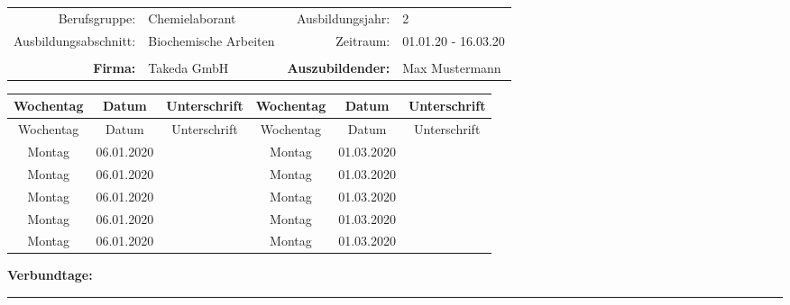 \documentclass[a4paper]{scrartcl}
\begin{document}
\begin{table}
	\centering
	\begin{tabular}{rlrl}
	Berufsgruppe: & Chemielaborant & Ausbildungsjahr: & 2\\
	Ausbildungsabschnitt: & Biochemische Arbeiten & Zeitraum: & 01.01.20 - 16.03.20\\
	& & & \\
	\textbf{Firma:} & Takeda GmbH & \textbf{Auszubildender:} & Max Mustermann\\
	\end{tabular}
\end{table}

\Large
\centering

\begin{longtable}{cccccc}
	Wochentag & Datum & Unterschrift & Wochentag & Datum & Unterschrift\\
	\hline
	\endfirsthead
	Wochentag & Datum & Unterschrift & Wochentag & Datum & Unterschrift\\
	\hline
	\endhead
	Montag & 06.01.2020 & & Montag & 01.03.2020 & \\
	\cline{3-3}\cline{6-6}
	Montag & 06.01.2020 & & Montag & 01.03.2020 & \\
	\cline{3-3}\cline{6-6}
	Montag & 06.01.2020 & & Montag & 01.03.2020 & \\
	\cline{3-3}\cline{6-6}
	Montag & 06.01.2020 & & Montag & 01.03.2020 & \\
	\cline{3-3}\cline{6-6}
	Montag & 06.01.2020 & & Montag & 01.03.2020 & \\
	\cline{3-3}\cline{6-6}
\end{longtable}
\textbf{Verbundtage:} \rule{2cm}{0.4pt}
\end{document}
